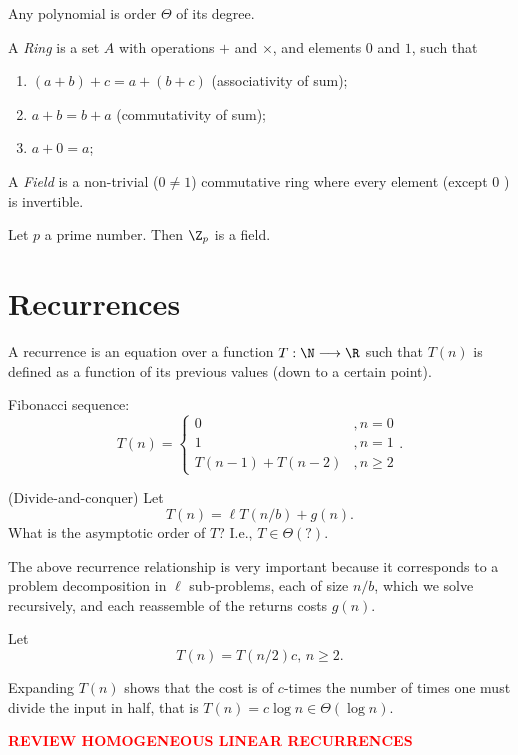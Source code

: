 \begin{lemma}
    Any polynomial is order $\Theta$ of its degree.
\end{lemma}

\begin{definition}
    A \emph{Ring} is a set $A$ with operations $+$ and $\times $, and elements $0$ and $1$, such that
    \begin{enumerate}
        \item $(a+b) + c = a + (b+c)$ (associativity of sum);
	\item $a+b = b+a$ (commutativity of sum);
	\item $a+0=a$;
    \end{enumerate}
\end{definition}

\begin{definition}
    A \emph{Field} is a non-trivial ($0\neq 1$) commutative ring where every element (except $0$ ) is invertible.
\end{definition}

\begin{lemma}
    Let $p$ a prime number.
    Then $\Z_p$ is a field.
\end{lemma}


\section*{Recurrences}

\begin{definition}
    A recurrence is an equation over a function $T: \N \longrightarrow \R$ such that $T(n)$ is defined as a function of its previous values (down to a certain point).
\end{definition}
\begin{eg}
    Fibonacci sequence: \[
    T(n) = \begin{cases}
	0 & ,n=0 \\
	1 & ,n=1 \\
	T(n-1)+T(n-2) &, n\ge 2
    \end{cases}
    .\] 
\end{eg}

\begin{problem}
    (Divide-and-conquer)
    Let \[
	T(n) = \ell T(n/b) + g(n)
    .\] 
    What is the asymptotic order of $T$? I.e., $T\in \Theta(?)$.
\end{problem}
The above recurrence relationship is very important because it corresponds to a problem decomposition in $\ell$ sub-problems, each of size $n / b$, which we solve recursively, and each reassemble of the returns costs $g(n)$.

\begin{eg}
    Let \[
    T(n) = T(n /2)  c,\, n\ge 2
    .\] 
    
    Expanding $T(n)$ shows that the cost is of $c$-times the number of times one must divide the input in half, that is $T(n) = c \log n\in \Theta(\log n)$.
\end{eg}

\textcolor{red}{\textbf{REVIEW HOMOGENEOUS LINEAR RECURRENCES}}

